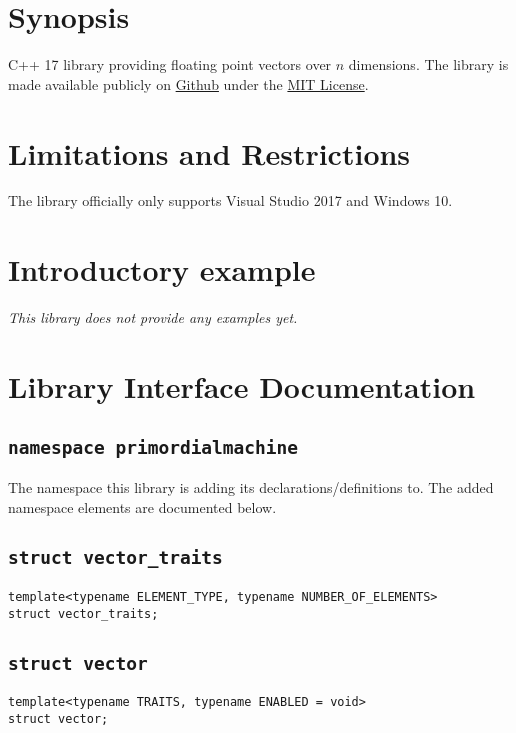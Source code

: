 \documentclass[oneside]{book}
\begin{document}
\maketitle
\tableofcontents
\chapter{Synopsis}
C++ 17 library providing floating point vectors over $n$ dimensions.
The library is made available publicly on
\href{\GetLibraryRepository}{Github}
under the
\href{\GetLibraryRepository/blob/master/LICENSE}{MIT License}.

\chapter{Limitations and Restrictions}
The library officially only supports Visual Studio 2017 and Windows 10.

\chapter{Introductory example}
\textit{\color{orange}This library does not provide any examples yet.}



\chapter{Library Interface Documentation}

\section{\texttt{namespace primordialmachine}}
The namespace this library is adding its declarations/definitions to.
The added namespace elements are documented below.



\section{\texttt{struct vector\_traits}}
\begin{verbatim}
template<typename ELEMENT_TYPE, typename NUMBER_OF_ELEMENTS>
struct vector_traits;
\end{verbatim}

\section{\texttt{struct vector}}
\begin{verbatim}
template<typename TRAITS, typename ENABLED = void>
struct vector;
\end{verbatim}
\end{document}
